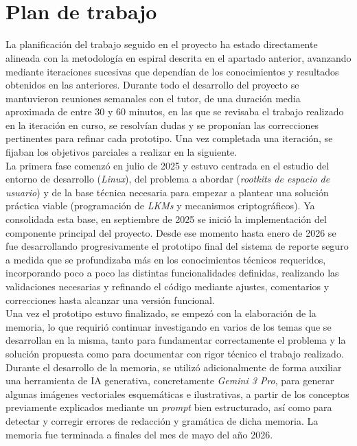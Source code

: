 \

\

\section{Plan de trabajo}

La planificación del trabajo seguido en el proyecto ha estado directamente alineada con la metodología en espiral descrita en el apartado anterior, avanzando mediante iteraciones sucesivas que dependían de los conocimientos y resultados obtenidos en las anteriores.
Durante todo el desarrollo del proyecto se mantuvieron reuniones semanales con el tutor, de una duración media aproximada de entre 30 y 60 minutos, en las que se revisaba el trabajo realizado en la iteración en curso, se resolvían dudas y se proponían las correcciones pertinentes para refinar cada prototipo.
Una vez completada una iteración, se fijaban los objetivos parciales a realizar en la siguiente.\\

La primera fase comenzó en julio de 2025 y estuvo centrada en el estudio del entorno de desarrollo (\textit{Linux}), del problema a abordar (\textit{rootkits de espacio de usuario}) y de la base técnica necesaria para empezar a plantear una solución práctica viable (programación de \textit{LKMs} y mecanismos criptográficos).
Ya consolidada esta base, en septiembre de 2025 se inició la implementación del componente principal del proyecto.
Desde ese momento hasta enero de 2026 se fue desarrollando progresivamente el prototipo final del sistema de reporte seguro a medida que se profundizaba más en los conocimientos técnicos requeridos, incorporando poco a poco las distintas funcionalidades definidas, realizando las validaciones necesarias y refinando el código mediante ajustes, comentarios y correcciones hasta alcanzar una versión funcional.\\

Una vez el prototipo estuvo finalizado, se empezó con la elaboración de la memoria, lo que requirió continuar investigando en varios de los temas que se desarrollan en la misma, tanto para fundamentar correctamente el problema y la solución propuesta como para documentar con rigor técnico el trabajo realizado.
Durante el desarrollo de la memoria, se utilizó adicionalmente de forma auxiliar una herramienta de IA generativa, concretamente \textit{Gemini 3 Pro}, para generar algunas imágenes vectoriales esquemáticas e ilustrativas, a partir de los conceptos previamente explicados mediante un \textit{prompt} bien estructurado, así como para detectar y corregir errores de redacción y gramática de dicha memoria.
La memoria fue terminada a finales del mes de mayo del año 2026.\\

